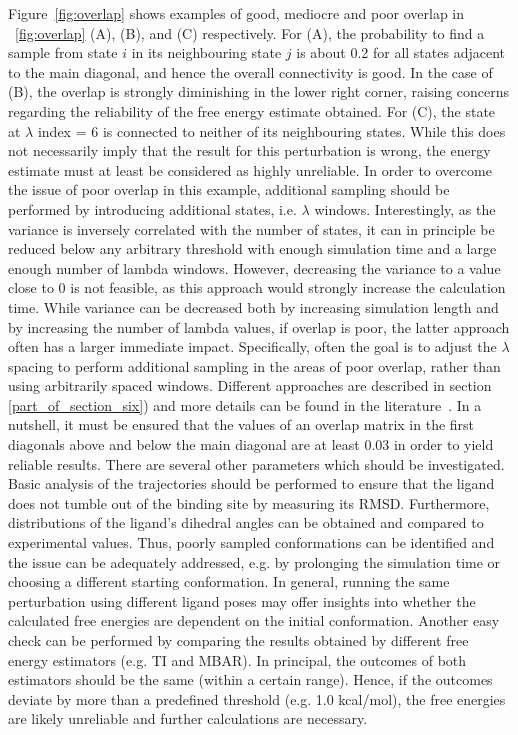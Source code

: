 \documentclass[9pt,bestpractices]{livecoms}
\begin{document}
Figure~\ref{fig:overlap} shows examples of good, mediocre and poor overlap in ~\ref{fig:overlap} (A), (B), and (C) respectively. For (A), the probability to find a sample from state $i$ in its neighbouring state $j$ is about 0.2 for all states adjacent to the main diagonal, and hence the overall connectivity is good. In the case of (B), the overlap is strongly diminishing in the lower right corner, raising concerns regarding the reliability of the free energy estimate obtained. For (C), the state at $\lambda$ index = 6 is connected to neither of its neighbouring states. While this does not necessarily imply that the result for this perturbation is wrong, the energy estimate must at least be considered as highly unreliable.
In order to overcome the issue of poor overlap in this example, additional sampling should be performed by introducing additional states, i.e. $\lambda$ windows.
%
Interestingly, as the variance is inversely correlated with the number of states\cite{klimovich2015guidelines}, it can in principle be reduced below any arbitrary threshold with enough simulation time and a large enough number of lambda windows. However, decreasing the variance to a value close to 0 is not feasible, as this approach would strongly increase the calculation time. While variance can be decreased both by increasing simulation length and by increasing the number of lambda values, if overlap is poor, the latter approach often has a larger immediate impact.  Specifically, often the goal is to adjust the $\lambda$ spacing to perform additional sampling in the areas of poor overlap, rather than using arbitrarily spaced windows. Different approaches are described in section \ref{part_of_section_six}) and more details can be found in the literature~\cite{dakka2018concurrent, hahn2019alchemical}.
%
In a nutshell, it must be ensured that the values of an overlap matrix in the first diagonals above and below the main diagonal are at least 0.03 in order to yield reliable results. 
%
There are several other parameters which should be investigated. Basic analysis of the trajectories should be performed to ensure that the ligand does not tumble out of the binding site by measuring its RMSD. Furthermore, distributions of the ligand's dihedral angles can be obtained and compared to experimental values. Thus, poorly sampled conformations can be identified and the issue can be adequately addressed, e.g. by prolonging the simulation time or choosing a different starting conformation. In general, running the same perturbation using different ligand poses may offer insights into whether the calculated free energies are dependent on the initial conformation.
Another easy check can be performed by comparing the results obtained by different free energy estimators (e.g. TI and MBAR). In principal, the outcomes of both estimators should be the same (within a certain range). Hence, if the outcomes deviate by more than a predefined threshold (e.g. 1.0 kcal/mol), the free energies are likely unreliable and further calculations are necessary.
\end{document}
